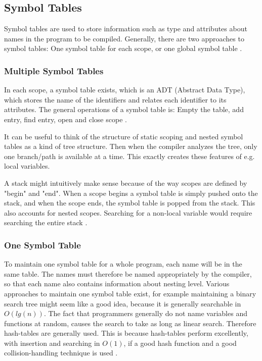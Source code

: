 \subsection{Symbol Tables}
Symbol tables are used to store information such as type and attributes about names in the program to be compiled. Generally, there are two approaches to symbol tables: One symbol table for each scope, or one global symbol table \citep{sebesta}. 
\subsubsection{Multiple Symbol Tables}
In each scope, a symbol table exists, which is an ADT (Abstract Data Type), which stores the name of the identifiers and relates each identifier to its attributes. The general operations of a symbol table is: Empty the table, add entry, find entry, open and close scope \citep{sebesta}. 

It can be useful to think of the structure of static scoping and nested symbol tables as a kind of tree structure. Then when the compiler analyzes the tree, only one branch/path is available at a time. This exactly creates these features of e.g. local variables.

A stack might intuitively make sense because of the way scopes are defined by "begin" and "end". When a scope begins a symbol table is simply pushed onto the stack, and when the scope ends, the symbol table is popped from the stack. This also accounts for nested scopes. Searching for a non-local variable would require searching the entire stack \citep{sebesta}. 

\subsubsection{One Symbol Table}
To maintain one symbol table for a whole program, each name will be in the same table. The names must therefore be named appropriately by the compiler, so that each name also contains information about nesting level. Various approaches to maintain one symbol table exist, for example maintaining a binary search tree might seem like a good idea, because it is generally searchable in $O(lg(n))$. The fact that programmers generally do not name variables and functions at random, causes the search to take as long as linear search. Therefore hash-tables are generally used. This is because hash-tables perform excellently, with insertion and searching in $O(1)$, if a good hash function and a good collision-handling technique is used \citep{sebesta}.